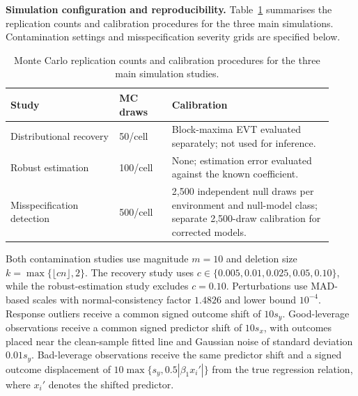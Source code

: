 \documentclass[../main.tex]{subfiles}
\begin{document}
\medskip
\noindent\textbf{Simulation configuration and reproducibility.}
Table~\ref{tab:simulation-configuration} summarises the replication counts
and calibration procedures for the three main simulations.
Contamination settings and misspecification severity grids are
specified below.

\begin{table}[htbp]
	\centering
	\caption{Monte Carlo replication counts and calibration
		procedures for the three main simulation studies.}
	\label{tab:simulation-configuration}
	\small
	\setlength{\tabcolsep}{4pt}
	\renewcommand{\arraystretch}{1.12}
	\begin{tabular}{@{}p{0.31\linewidth}p{0.15\linewidth}
			p{0.46\linewidth}@{}}
		\toprule
		Study & MC draws & Calibration \\
		\midrule
		Distributional recovery
		& 50/cell
		& Block-maxima EVT evaluated separately; not used for inference. \\
		
		Robust estimation
		& 100/cell
		& None; estimation error evaluated against the known coefficient. \\
		
		Misspecification detection
		& 500/cell
		& 2,500 independent null draws per environment and null-model class;
		separate 2,500-draw calibration for corrected models. \\
		\bottomrule
	\end{tabular}
\end{table}



Both contamination studies use magnitude \(m=10\) and deletion size \(k=\max\{\lfloor cn\rfloor,2\}\). The recovery study uses \(c\in\{0.005,0.01,0.025,0.05,0.10\}\), while the robust-estimation study excludes \(c=0.10\). Perturbations use MAD-based scales with normal-consistency factor \(1.4826\) and lower bound \(10^{-4}\). Response outliers receive a common signed outcome shift of \(10s_y\). Good-leverage observations receive a common signed predictor shift of \(10s_x\), with outcomes placed near the clean-sample fitted line and Gaussian noise of standard deviation \(0.01s_y\). Bad-leverage observations receive the same predictor shift and a signed outcome displacement of \(10\max\{s_y,0.5|\beta_1x_i'|\}\) from the true regression relation, where \(x_i'\) denotes the shifted predictor.
\end{document}
